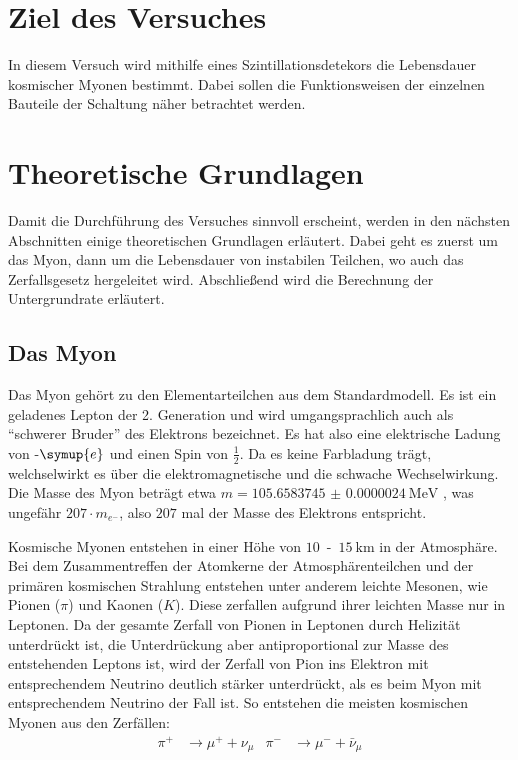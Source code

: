 \section{Ziel des Versuches}
\label{sec:ziel}

    \noindent In diesem Versuch wird mithilfe eines Szintillationsdetekors die Lebensdauer kosmischer Myonen bestimmt. 
    Dabei sollen die Funktionsweisen der einzelnen Bauteile der Schaltung näher betrachtet werden. 

\section{Theoretische Grundlagen}
\label{sec:Theorie}

    \noindent Damit die Durchführung des Versuches sinnvoll erscheint, werden in den nächsten Abschnitten einige theoretischen Grundlagen erläutert. 
    Dabei geht es zuerst um das Myon, dann um die Lebensdauer von instabilen Teilchen, wo auch das Zerfallsgesetz hergeleitet wird. Abschließend 
    wird die Berechnung der Untergrundrate erläutert. 

    \subsection{Das Myon}

        \noindent Das Myon gehört zu den Elementarteilchen aus dem Standardmodell. Es ist ein geladenes Lepton der 2. Generation und wird umgangsprachlich 
        auch als \enquote{schwerer Bruder} des Elektrons bezeichnet. Es hat also eine elektrische Ladung von -$\symup{e}$ und einen Spin von $\frac{1}{2}$. Da es keine 
        Farbladung trägt, welchselwirkt es über die elektromagnetische und die schwache Wechselwirkung. Die Masse des Myon beträgt etwa $m = \SI{105.6583745(24)}{\mega\electronvolt}$ 
        \cite{pdg}, was ungefähr $207 \cdot m_{e^-}$, also $207$ mal der Masse des Elektrons entspricht.   

        \noindent Kosmische Myonen entstehen in einer Höhe von $\num{10}$\, -\, $\SI{15}{\kilo\metre}$ in der Atmosphäre. Bei dem Zusammentreffen der Atomkerne der Atmosphärenteilchen und der primären 
        kosmischen Strahlung entstehen unter anderem leichte Mesonen, wie Pionen ($\pi$) und Kaonen ($K$). Diese zerfallen aufgrund ihrer leichten Masse nur in Leptonen. Da der gesamte 
        Zerfall von Pionen in Leptonen durch Helizität unterdrückt ist, die Unterdrückung aber antiproportional zur Masse des entstehenden Leptons ist, wird der Zerfall von Pion ins 
        Elektron mit entsprechendem Neutrino deutlich stärker unterdrückt, als es beim Myon mit entsprechendem Neutrino der Fall ist. So entstehen die meisten kosmischen Myonen aus den 
        Zerfällen: 
        \begin{align*}
            \pi^+ &\rightarrow \mu^+ + \nu_{\mu} & \pi^- &\rightarrow \mu^- + \bar{\nu}_{\mu}
        \end{align*}

